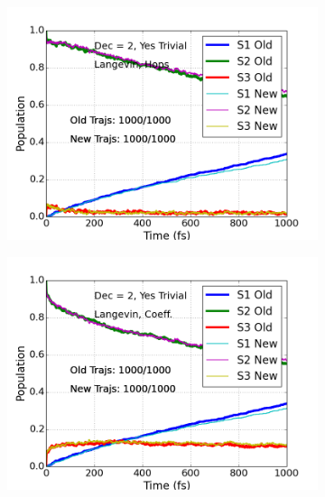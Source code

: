 \documentclass[letterpaper,12pt,titlepage]{article}
\begin{document}
\begin{appendix}
\begin{figure}[h]
\end{figure}
\begin{figure}[h]
        \centering
	\begin{subfigure}[h]{0.425\textwidth}  
            \centering 
            \includegraphics[scale=.35]{ppv_es_traj_decohere2_yestrivial_langevin_hops_old_v_new.png}
        \end{subfigure}
	\hspace{3mm}
        \begin{subfigure}[h]{0.425\textwidth}   
            \centering 
            \includegraphics[scale=.35]{ppv_es_traj_decohere2_yestrivial_langevin_coeff_old_v_new.png}
        \end{subfigure}

\end{figure}
\end{appendix}
\end{document}
